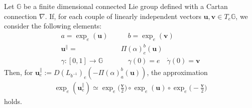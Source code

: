 \begin{theorem}\label{th:local_approximation_theorem}
	Let $\mathbb{G}$ be a finite dimensional connected Lie group defined with a Cartan connection $\nabla$. 
	If, for each couple of linearly independent vectors $\mathbf{u}, \mathbf{v} \in T_{e}\mathbb{G}$, we consider the following elements:
	\begin{align*}
	a= \exp_{e}(\mathbf{u}) 
	\quad & \quad  
	b= \exp_{e}(\mathbf{v}) \\
	\mathbf{u}^{\parallel} = & \Pi(\alpha)_{e}^{b}(\mathbf{u})\\
	\gamma : [0,1] \rightarrow \mathbb{G} &\quad \gamma(0) = e \quad \dot{\gamma}(0) = \mathbf{v}
	\end{align*}
	Then, for $\mathbf{u}_{e}^{\parallel} := D(L_{b^{-1}})_{e}( -\Pi(\alpha)_{a}^{b}(\mathbf{u}))$, the approximation
	\begin{align*}
	\exp_{e}(\mathbf{u}_{e}^{\parallel}) 
	\simeq
	\exp_{e}\big(\frac{\mathbf{v}}{2}\big)   
	\circ  \exp_{e}(\mathbf{u}) 
	\circ \exp_{e}\big(-\frac{\mathbf{v}}{2}\big)
	\end{align*}
	holds.
\end{theorem}


